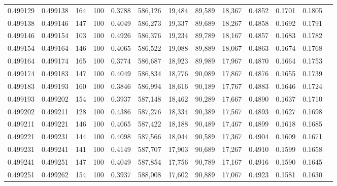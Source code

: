 \begin{tabular}{rrrrrrrrrrrrr}
0.499129 & 0.499138 &   164 & 100 &                                     0.3788 & 586,126 &  19,484 &  89,589 &  18,367 & 0.4852 & 0.1701 & 0.1805 \\
0.499138 & 0.499146 &   147 & 100 &                                     0.4049 & 586,273 &  19,337 &  89,689 &  18,267 & 0.4858 & 0.1692 & 0.1791 \\
0.499146 & 0.499154 &   103 & 100 &                                     0.4926 & 586,376 &  19,234 &  89,789 &  18,167 & 0.4857 & 0.1683 & 0.1782 \\
0.499154 & 0.499164 &   146 & 100 &                                     0.4065 & 586,522 &  19,088 &  89,889 &  18,067 & 0.4863 & 0.1674 & 0.1768 \\
0.499164 & 0.499174 &   165 & 100 &                                     0.3774 & 586,687 &  18,923 &  89,989 &  17,967 & 0.4870 & 0.1664 & 0.1753 \\
0.499174 & 0.499183 &   147 & 100 &                                     0.4049 & 586,834 &  18,776 &  90,089 &  17,867 & 0.4876 & 0.1655 & 0.1739 \\
0.499183 & 0.499193 &   160 & 100 &                                     0.3846 & 586,994 &  18,616 &  90,189 &  17,767 & 0.4883 & 0.1646 & 0.1724 \\
0.499193 & 0.499202 &   154 & 100 &                                     0.3937 & 587,148 &  18,462 &  90,289 &  17,667 & 0.4890 & 0.1637 & 0.1710 \\
0.499202 & 0.499211 &   128 & 100 &                                     0.4386 & 587,276 &  18,334 &  90,389 &  17,567 & 0.4893 & 0.1627 & 0.1698 \\
0.499211 & 0.499221 &   146 & 100 &                                     0.4065 & 587,422 &  18,188 &  90,489 &  17,467 & 0.4899 & 0.1618 & 0.1685 \\
0.499221 & 0.499231 &   144 & 100 &                                     0.4098 & 587,566 &  18,044 &  90,589 &  17,367 & 0.4904 & 0.1609 & 0.1671 \\
0.499231 & 0.499241 &   141 & 100 &                                     0.4149 & 587,707 &  17,903 &  90,689 &  17,267 & 0.4910 & 0.1599 & 0.1658 \\
0.499241 & 0.499251 &   147 & 100 &                                     0.4049 & 587,854 &  17,756 &  90,789 &  17,167 & 0.4916 & 0.1590 & 0.1645 \\
0.499251 & 0.499262 &   154 & 100 &                                     0.3937 & 588,008 &  17,602 &  90,889 &  17,067 & 0.4923 & 0.1581 & 0.1630 \\

\end{tabular}
